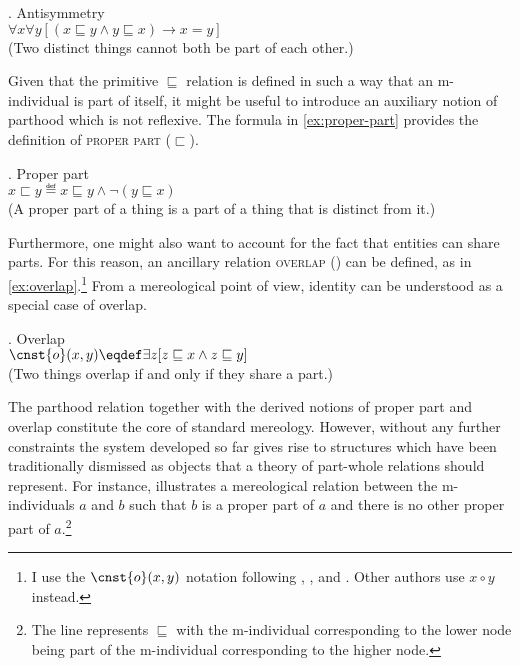 \ex. Antisymmetry \citep[p. 516; adapted]{champollion_krifka2016mereology}\label{ex:antisymmetry}\\
$\forall x\forall y[(x\sqsubseteq y\wedge y\sqsubseteq x)\rightarrow x=y]$\\
(Two distinct things cannot both be part of each other.)

Given that the primitive $\sqsubseteq$ relation is defined in such a way that an m-individual is part of itself, it might be useful to introduce an auxiliary notion of parthood which is not reflexive. The formula in \ref{ex:proper-part} provides the definition of \textsc{proper part} ($\sqsubset$).

\ex. Proper part \citep[p. 36]{casati_varzi1999parts}\label{ex:proper-part}\\
$x \sqsubset y \eqdef x \sqsubseteq y \wedge \neg(y \sqsubseteq x)$\\
(A proper part of a thing is a part of a thing that is distinct from it.)

Furthermore, one might also want to account for the fact that entities can share parts. For this reason, an ancillary relation \textsc{overlap} () can be defined, as in \ref{ex:overlap}.\footnote{I use the $\cnst{o}(x,y)$ notation following \citet{casati_varzi1999parts}, \citet{varzi2007spatial}, and \citet{grimm2012number}. Other authors use $x \circ y$ instead.} From a mereological point of view, identity can be understood as a special case of overlap.

\ex. Overlap \citep[p. 516; adapted]{champollion_krifka2016mereology}\label{ex:overlap}\\ 
$\cnst{o}(x,y) \eqdef \exists z[z \sqsubseteq x \wedge z \sqsubseteq y]$\\
(Two things overlap if and only if they share a part.)

The parthood relation together with the derived notions of proper part and overlap constitute the core of standard mereology. However, without any further constraints the system developed so far gives rise to structures which have been traditionally dismissed as objects that a theory of part-whole relations should represent. For instance,  illustrates a mereological relation between the m-individuals $a$ and $b$ such that $b$ is a proper part of $a$ and there is no other proper part of $a$.\footnote{The line represents $\sqsubseteq$ with the m-individual corresponding to the lower node being part of the m-individual corresponding to the higher node.} 


